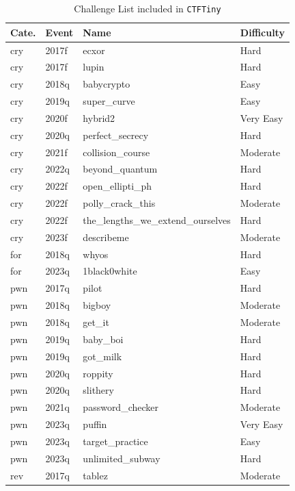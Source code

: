 \begin{table}[H]
    \centering
    \caption{Challenge List included in \texttt{CTFTiny}}
    \label{table:challist}
    \scriptsize
    \begin{tabular}{|l|l|p{3.5cm}|l|}
        \hline
        \textbf{Cate.} & \textbf{Event} & \textbf{Name} & \textbf{Difficulty} \\
        \hline
        cry & 2017f & ecxor & Hard \\
        cry & 2017f & lupin & Hard \\
        cry & 2018q & babycrypto & Easy \\
        cry & 2019q & super\_curve & Easy \\
        cry & 2020f & hybrid2 & Very Easy \\
        cry & 2020q & perfect\_secrecy & Hard \\
        cry & 2021f & collision\_course & Moderate \\
        cry & 2022q & beyond\_quantum & Hard \\
        cry & 2022f & open\_ellipti\_ph & Hard \\
        cry & 2022f & polly\_crack\_this & Moderate \\
        cry & 2022f & the\_lengths\_we\_extend\_ourselves & Hard \\
        cry & 2023f & describeme & Moderate \\
        for & 2018q & whyos & Hard \\
        for & 2023q & 1black0white & Easy \\
        pwn & 2017q & pilot & Hard \\
        pwn & 2018q & bigboy & Moderate \\
        pwn & 2018q & get\_it & Moderate \\
        pwn & 2019q & baby\_boi & Hard \\
        pwn & 2019q & got\_milk & Hard \\
        pwn & 2020q & roppity & Hard \\
        pwn & 2020q & slithery & Hard \\
        pwn & 2021q & password\_checker & Moderate \\
        pwn & 2023q & puffin & Very Easy \\
        pwn & 2023q & target\_practice & Easy \\
        pwn & 2023q & unlimited\_subway & Hard \\
        rev & 2017q & tablez & Moderate \\

\end{tabular}
\end{table}
